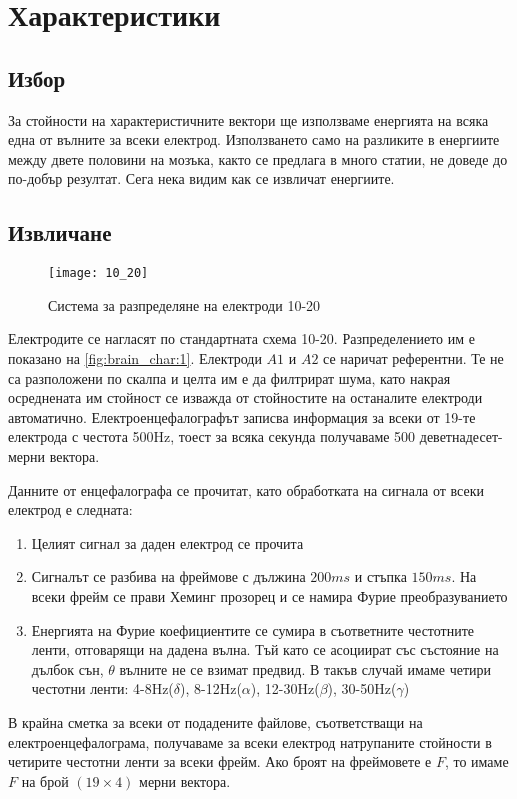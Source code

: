 \documentclass[main.tex]{subfiles}
\begin{document}
\section{Характеристики}
\subsection{Избор}
За стойности на характеристичните вектори ще използваме енергията на всяка една от вълните за всеки електрод. Използването само на разликите в енергиите между двете половини на мозъка, както се предлага в много статии, не доведе до по-добър резултат. Сега нека видим как се извличат енергиите.

\subsection{Извличане}

\begin{minipage}{0.45\textwidth}
        \begin{figure}[H]
                \texttt{[image: 10\_20]}
                \caption{Система за разпределяне на електроди 10-20}
                \label{fig:brain_char:1}
        \end{figure}
\end{minipage} \hfill
\begin{minipage}{0.45\textwidth}
        Електродите се нагласят по стандартната схема 10-20. Разпределението им е показано на \autoref{fig:brain_char:1}. Електроди $A1$ и $A2$ се наричат референтни. Те не са разположени по скалпа и целта им е да филтрират шума, като накрая осреднената им стойност се изважда от стойностите на останалите електроди автоматично. Електроенцефалографът записва информация за всеки от 19-те електрода с честота 500Hz, тоест за всяка секунда получаваме 500 деветнадесет-мерни вектора.
\end{minipage}
Данните от енцефалографа се прочитат, като обработката на сигнала от всеки електрод е следната:
\begin{enumerate}
        \item Целият сигнал за даден електрод се прочита
        \item Сигналът се разбива на фреймове с дължина $200ms$ и стъпка $150ms$. На всеки фрейм се прави Хеминг прозорец и се намира Фурие преобразуванието
        \item Енергията на Фурие коефициентите се сумира в съответните честотните ленти, отговарящи на дадена вълна. Тъй като се асоциират със състояние на дълбок сън, $\theta$ вълните не се взимат предвид. В такъв случай имаме четири честотни ленти: 4-8Hz($\delta$), 8-12Hz($\alpha$), 12-30Hz($\beta$), 30-50Hz($\gamma$)
\end{enumerate}
В крайна сметка за всеки от подадените файлове, съответстващи на електроенцефалограма, получаваме за всеки електрод натрупаните стойности в четирите честотни ленти за всеки фрейм. Ако броят на фреймовете е $F$, то имаме $F$ на брой $(19\times4)$ мерни вектора.
\end{document}
